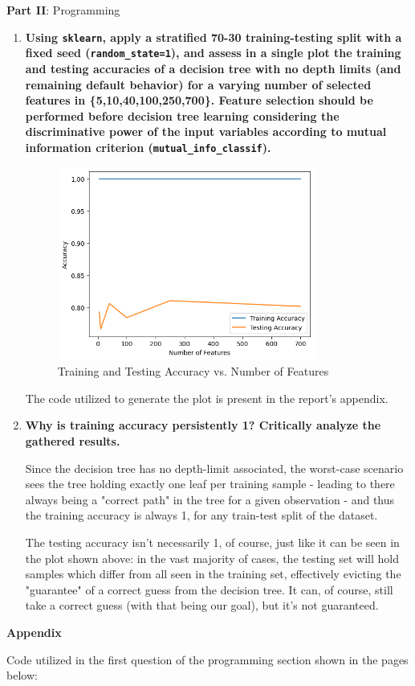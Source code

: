\documentclass[12pt]{article}
\begin{document}
\center\large{\textbf{Part II}: Programming}

\begin{enumerate}[leftmargin=\labelsep,resume]
  \item \textbf{Using \texttt{sklearn}, apply a stratified 70-30 training-testing split with a fixed seed (\texttt{random\_state=1}), and assess in a single plot the training and testing accuracies of a decision tree with no depth limits (and remaining default behavior) for a varying number of selected features in \{5,10,40,100,250,700\}. Feature selection should be performed before decision tree learning considering the discriminative power of the input variables according to mutual information criterion (\texttt{mutual\_info\_classif}).}

        \begin{figure}[htpb]
          \centering
          \includegraphics[width=0.8\textwidth]{../assets/hw1-2.1.png}
          \caption{Training and Testing Accuracy vs. Number of Features}
        \end{figure}

        The code utilized to generate the plot is present in the report's appendix.

  \item \textbf{Why is training accuracy persistently 1? Critically analyze the gathered results.}

        Since the decision tree has no depth-limit associated, the worst-case scenario sees the tree
        holding exactly one leaf per training sample - leading to there always being a "correct path" in the tree for a given observation - and thus the training accuracy is always 1, for any train-test split of the dataset.

        The testing accuracy isn't necessarily 1, of course, just like it can be seen in the plot shown above: in the vast majority of cases, the testing set will hold samples which differ from all seen in the training set, effectively evicting the "guarantee" of a correct guess from the decision tree. It can, of course, still take a correct guess (with that being our goal), but it's not guaranteed.

\end{enumerate}

\large{\textbf{Appendix}\vskip 0.3cm}

Code utilized in the first question of the programming section shown in the pages below:


\end{document}
